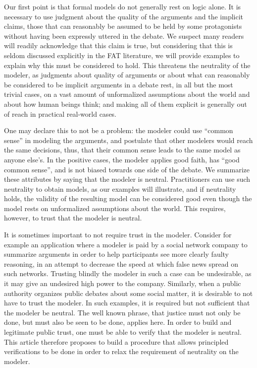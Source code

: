 \documentclass[version=3.21, pagesize, twoside=off, bibliography=totoc, DIV=calc, fontsize=12pt, a4paper, french, english]{scrartcl}
\begin{document}
Our first point is that formal models do not generally rest on logic alone. It is necessary to use judgment about the quality of the arguments and the implicit claims, those that can reasonably be assumed to be held by some protagonists without having been expressly uttered in the debate. We suspect many readers will readily acknowledge that this claim is true, but considering that this is seldom discussed explicitly in the FAT literature, we will provide examples to explain why this must be considered to hold.
This threatens the neutrality of the modeler, as judgments about quality of arguments or about what can reasonably be considered to be implicit arguments in a debate rest, in all but the most trivial cases, on a vast amount of unformalized assumptions about the world and about how human beings think; and making all of them explicit is generally out of reach in practical real-world cases.

One may declare this to not be a problem: the modeler could use “common sense” in modeling the arguments, and postulate that other modelers would reach the same decisions, thus, that their common sense leads to the same model as anyone else’s. In the positive cases, the modeler applies good faith, has “good common sense”, and is not biased towards one side of the debate. We summarize these attributes by saying that the modeler is neutral.
Practitioners can use such neutrality to obtain models, as our examples will illustrate, and if neutrality holds, the validity of the resulting model can be considered good even though the model rests on unformalized assumptions about the world. This requires, however, to trust that the modeler is neutral.
 
It is sometimes important to not require trust in the modeler. Consider for example an application where a modeler is paid by a social network company to summarize arguments in order to help participants see more clearly faulty reasoning, in an attempt to decrease the speed at which false news spread on such networks.
Trusting blindly the modeler in such a case can be undesirable, as it may give an undesired high power to the company.
Similarly, when a public authority organizes public debates about some social matter, it is desirable to not have to trust the modeler.
In such examples, it is required but not sufficient that the modeler be neutral. The well known phrase, that justice must not only be done, but must also be seen to be done, applies here. In order to build and legitimate public trust, one must be able to verify that the modeler is neutral. This article therefore proposes to build a procedure that allows principled verifications to be done in order to relax the requirement of neutrality on the modeler.
\end{document}
